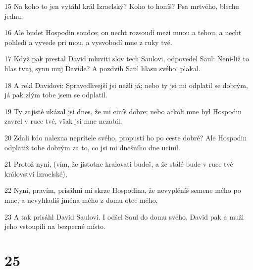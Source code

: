\par 15 Na koho to jen vytáhl král Izraelský? Koho to honíš? Psa mrtvého, blechu jednu.
\par 16 Ale budet Hospodin soudce; on necht rozsoudí mezi mnou a tebou, a necht pohledí a vyvede pri mou, a vysvobodí mne z ruky tvé.
\par 17 Když pak prestal David mluviti slov tech Saulovi, odpovedel Saul: Není-liž to hlas tvuj, synu muj Davide? A pozdvih Saul hlasu svého, plakal.
\par 18 A rekl Davidovi: Spravedlivejší jsi nežli já; nebo ty jsi mi odplatil se dobrým, já pak zlým tobe jsem se odplatil.
\par 19 Ty zajisté ukázal jsi dnes, že mi ciníš dobre; nebo ackoli mne byl Hospodin zavrel v ruce tvé, však jsi mne nezabil.
\par 20 Zdali kdo nalezna neprítele svého, propustí ho po ceste dobré? Ale Hospodin odplatiž tobe dobrým za to, co jsi mi dnešního dne ucinil.
\par 21 Protož nyní, (vím, že jistotne kralovati budeš, a že stálé bude v ruce tvé království Izraelské),
\par 22 Nyní, pravím, prisáhni mi skrze Hospodina, že nevypléníš semene mého po mne, a nevyhladíš jména mého z domu otce mého.
\par 23 A tak prisáhl David Saulovi. I odšel Saul do domu svého, David pak a muži jeho vstoupili na bezpecné místo.

\chapter{25}

